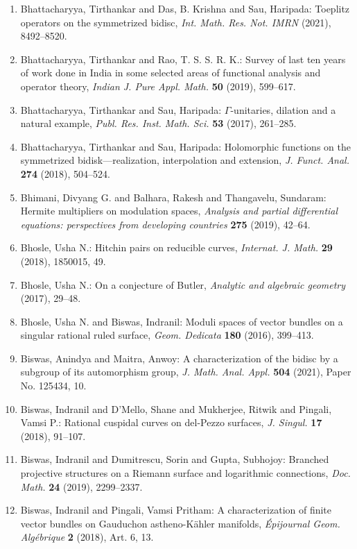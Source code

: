 \begin{enumerate}
\item Bhattacharyya, Tirthankar and Das, B. Krishna and Sau,
Haripada: Toeplitz operators on the symmetrized bidisc, \emph{Int. Math. Res. Not. IMRN} {\bf } (2021), 8492--8520.
\item Bhattacharyya, Tirthankar and Rao, T. S. S. R. K.: Survey of last ten years of work done in {I}ndia in some
selected areas of functional analysis and operator theory, \emph{Indian J. Pure Appl. Math.} {\bf 50} (2019), 599--617.
\item Bhattacharyya, Tirthankar and Sau, Haripada: {$\Gamma$}-unitaries, dilation and a natural example, \emph{Publ. Res. Inst. Math. Sci.} {\bf 53} (2017), 261--285.
\item Bhattacharyya, Tirthankar and Sau, Haripada: Holomorphic functions on the symmetrized bidisk---realization,
interpolation and extension, \emph{J. Funct. Anal.} {\bf 274} (2018), 504--524.
\item Bhimani, Divyang G. and Balhara, Rakesh and Thangavelu,
Sundaram: Hermite multipliers on modulation spaces, \emph{Analysis and partial differential equations: perspectives from
developing countries} {\bf 275} (2019), 42--64.
\item Bhosle, Usha N.: Hitchin pairs on reducible curves, \emph{Internat. J. Math.} {\bf 29} (2018), 1850015, 49.
\item Bhosle, Usha N.: On a conjecture of {B}utler, \emph{Analytic and algebraic geometry} {\bf } (2017), 29--48.
\item Bhosle, Usha N. and Biswas, Indranil: Moduli spaces of vector bundles on a singular rational ruled
surface, \emph{Geom. Dedicata} {\bf 180} (2016), 399--413.
\item Biswas, Anindya and Maitra, Anwoy: A characterization of the bidisc by a subgroup of its
automorphism group, \emph{J. Math. Anal. Appl.} {\bf 504} (2021), Paper No. 125434, 10.
\item Biswas, Indranil and D'Mello, Shane and Mukherjee, Ritwik and
Pingali, Vamsi P.: Rational cuspidal curves on del-{P}ezzo surfaces, \emph{J. Singul.} {\bf 17} (2018), 91--107.
\item Biswas, Indranil and Dumitrescu, Sorin and Gupta, Subhojoy: Branched projective structures on a {R}iemann surface and
logarithmic connections, \emph{Doc. Math.} {\bf 24} (2019), 2299--2337.
\item Biswas, Indranil and Pingali, Vamsi Pritham: A characterization of finite vector bundles on {G}auduchon
astheno-{K}\"{a}hler manifolds, \emph{\'{E}pijournal Geom. Alg\'{e}brique} {\bf 2} (2018), Art. 6, 13.

\end{enumerate}
